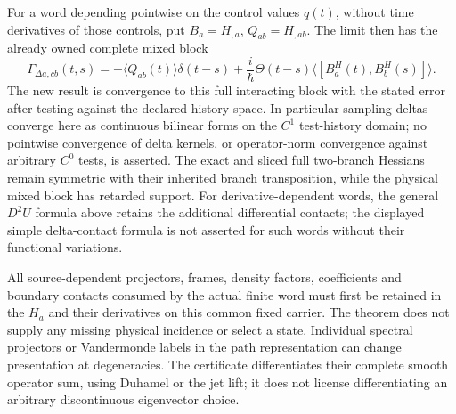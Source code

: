 \documentclass[12pt,a4paper]{article}
\begin{document}
For a word depending pointwise on the control values $q(t)$, without time
derivatives of those controls, put $B_a=H_{,a}$, $Q_{ab}=H_{,ab}$.
The limit then has the already owned complete mixed block
\[
 \Gamma_{\Delta a,c b}(t,s)
 =-\langle Q_{ab}(t)\rangle\delta(t-s)
 +\frac{i}{\hbar}\Theta(t-s)
          \langle[B_a^H(t),B_b^H(s)]\rangle.
\]
The new result is convergence to this full interacting block with the
stated error after testing against the declared history space. In
particular sampling deltas converge here as continuous bilinear forms
on the $C^1$ test-history domain; no pointwise convergence of delta
kernels, or operator-norm convergence against arbitrary $C^0$ tests,
is asserted. The exact and sliced full two-branch Hessians remain
symmetric with their inherited branch transposition, while the physical
mixed block has retarded support.
For derivative-dependent words, the general $D^2U$ formula above retains
the additional differential contacts; the displayed simple delta-contact
formula is not asserted for such words without their functional variations.

All source-dependent projectors, frames, density factors, coefficients and
boundary contacts consumed by the actual finite word must first be retained
in the $H_a$ and their derivatives on this common fixed carrier. The theorem
does not supply any missing physical incidence or select a state. Individual
spectral projectors or Vandermonde labels in the path representation can
change presentation at degeneracies. The certificate differentiates their
complete smooth operator sum, using Duhamel or the jet lift; it does not
license differentiating an arbitrary discontinuous eigenvector choice.
\end{document}
